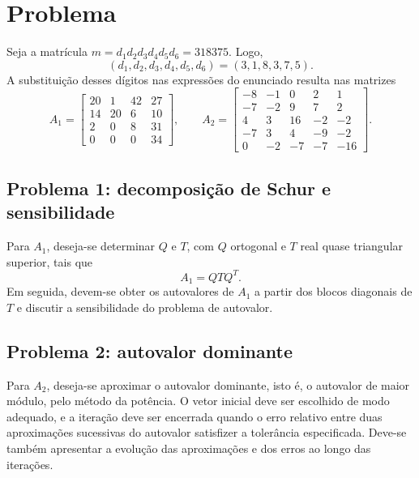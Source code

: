 \section{Problema}

Seja a matrícula \(m=d_1d_2d_3d_4d_5d_6=318375\). Logo,
\[
(d_1,d_2,d_3,d_4,d_5,d_6)=(3,1,8,3,7,5).
\]
A substituição desses dígitos nas expressões do enunciado resulta nas matrizes
\[
A_1=\begin{bmatrix}
20&1&42&27\\
14&20&6&10\\
2&0&8&31\\
0&0&0&34
\end{bmatrix},\qquad
A_2=\begin{bmatrix}
-8&-1&0&2&1\\
-7&-2&9&7&2\\
4&3&16&-2&-2\\
-7&3&4&-9&-2\\
0&-2&-7&-7&-16
\end{bmatrix}.
\]

\subsection{Problema 1: decomposição de Schur e sensibilidade}

Para \(A_1\), deseja-se determinar \(Q\) e \(T\), com \(Q\) ortogonal e \(T\) real quase triangular superior, tais que
\[
A_1=QTQ^T.
\]
Em seguida, devem-se obter os autovalores de \(A_1\) a partir dos blocos diagonais de \(T\) e discutir a sensibilidade do problema de autovalor.

\subsection{Problema 2: autovalor dominante}

Para \(A_2\), deseja-se aproximar o autovalor dominante, isto é, o autovalor de maior módulo, pelo método da potência. O vetor inicial deve ser escolhido de modo adequado, e a iteração deve ser encerrada quando o erro relativo entre duas aproximações sucessivas do autovalor satisfizer a tolerância especificada. Deve-se também apresentar a evolução das aproximações e dos erros ao longo das iterações.

